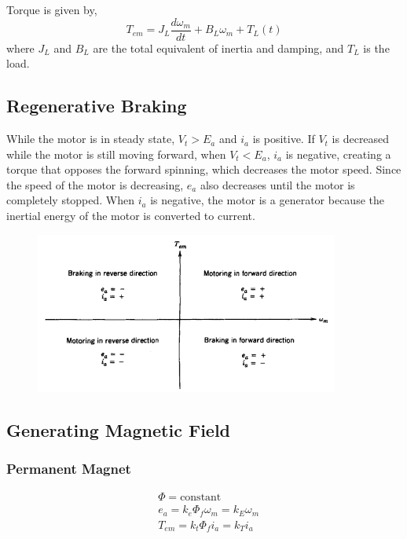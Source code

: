 \documentclass{article}
\begin{document}
    Torque is given by,
    \begin{equation*}
        T_{em} = J_{L}\frac{d\omega_{m}}{dt} + B_{L}\omega_{m} + T_{L}(t)
    \end{equation*}
    where $J_{L}$ and $B_{L}$ are the total equivalent of inertia and damping, and $T_{L}$ is the load.

    \subsection*{Regenerative Braking}
    While the motor is in steady state, $V_{t} > E_{a}$ and $i_{a}$ is positive. If $V_{t}$ is decreased while 
    the motor is still moving forward, when $V_{t} < E_{a}$, $i_{a}$ is negative, creating a torque that 
    opposes the forward spinning, which decreases the motor speed. Since the speed of the motor is 
    decreasing, $e_{a}$ also decreases until the motor is completely stopped. When $i_{a}$ is negative, the motor is 
    a generator because the inertial energy of the motor is converted to current.

    \begin{figure}[H]
            \centering
            \includegraphics[width=10cm]{figures/4q_operation.png}
    \end{figure}

    \subsection*{Generating Magnetic Field}    
    \subsubsection*{Permanent Magnet}
    \begin{align*}
        &\Phi = \text{constant}\\
        &e_{a} = k_{e} \Phi_{f} \omega_{m} = k_{E} \omega_{m}\\
        &T_{em} = k_{t} \Phi_{f} i_{a} = k_{T} i_{a}
    \end{align*}
\end{document}

